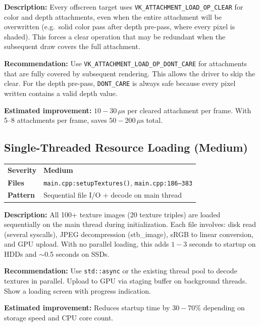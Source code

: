 \documentclass[a4paper,10pt]{article}
\newcommand{\us}{\ensuremath{\,\mu\text{s}}}
\newcommand{\severity}[1]{%
  \ifstrequal{#1}{Critical}{\textcolor{critical}{\textbf{#1}}}{%
  \ifstrequal{#1}{High}{\textcolor{high}{\textbf{#1}}}{%
  \ifstrequal{#1}{Medium}{\textcolor{medium}{\textbf{#1}}}{%
  \ifstrequal{#1}{Low}{\textcolor{low}{\textbf{#1}}}{#1}}}}}
\begin{document}
\vspace{0.5em}
\noindent
\textbf{Description:} Every offscreen target uses
\texttt{VK\_ATTACHMENT\_LOAD\_OP\_CLEAR} for color and depth attachments,
even when the entire attachment will be overwritten (e.g.\ solid color pass
after depth pre-pass, where every pixel is shaded). This forces a clear
operation that may be redundant when the subsequent draw covers the full
attachment.

\noindent\textbf{Recommendation:} Use \texttt{VK\_ATTACHMENT\_LOAD\_OP\_DONT\_CARE}
for attachments that are fully covered by subsequent rendering. This allows
the driver to skip the clear. For the depth pre-pass, \texttt{DONT\_CARE}
is always safe because every pixel written contains a valid depth value.

\noindent\textbf{Estimated improvement:} $10{-}30\us$ per cleared attachment
per frame. With 5--8 attachments per frame, saves $50{-}200\us$ total.

\subsection{Single-Threaded Resource Loading (Medium)}

\begin{tabular}{ll}
\textbf{Severity} & \severity{Medium} \\
\textbf{Files}     & \texttt{main.cpp:setupTextures()},
                      \texttt{main.cpp:186--383} \\
\textbf{Pattern}   & Sequential file I/O + decode on main thread \\
\end{tabular}

\vspace{0.5em}
\noindent
\textbf{Description:} All 100+ texture images (20 texture triples) are loaded
sequentially on the main thread during initialization. Each file involves:
disk read (several syscalls), JPEG decompression (stb\_image), sRGB to linear
conversion, and GPU upload. With no parallel loading, this adds $1{-}3$
seconds to startup on HDDs and $\sim$0.5 seconds on SSDs.

\noindent\textbf{Recommendation:} Use \texttt{std::async} or the existing
thread pool to decode textures in parallel. Upload to GPU via staging buffer
on background threads. Show a loading screen with progress indication.

\noindent\textbf{Estimated improvement:} Reduces startup time by
$30{-}70\%$ depending on storage speed and CPU core count.
\end{document}
